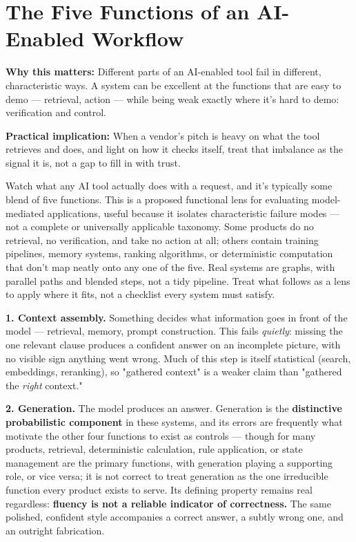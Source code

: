 \section{The Five Functions of an AI-Enabled Workflow}

\textbf{Why this matters:} Different parts of an AI-enabled tool fail in different, characteristic ways. A system can be excellent at the functions that are easy to demo --- retrieval, action --- while being weak exactly where it's hard to demo: verification and control.

\textbf{Practical implication:} When a vendor's pitch is heavy on what the tool retrieves and does, and light on how it checks itself, treat that imbalance as the signal it is, not a gap to fill in with trust.

Watch what any AI tool actually does with a request, and it's typically some blend of five functions. This is a proposed functional lens for evaluating model-mediated applications, useful because it isolates characteristic failure modes --- not a complete or universally applicable taxonomy. Some products do no retrieval, no verification, and take no action at all; others contain training pipelines, memory systems, ranking algorithms, or deterministic computation that don't map neatly onto any one of the five. Real systems are graphs, with parallel paths and blended steps, not a tidy pipeline. Treat what follows as a lens to apply where it fits, not a checklist every system must satisfy.

\textbf{1. Context assembly.} Something decides what information goes in front of the model --- retrieval, memory, prompt construction. This fails \emph{quietly}: missing the one relevant clause produces a confident answer on an incomplete picture, with no visible sign anything went wrong. Much of this step is itself statistical (search, embeddings, reranking), so "gathered context" is a weaker claim than "gathered the \emph{right} context."

\textbf{2. Generation.} The model produces an answer. Generation is the \textbf{distinctive probabilistic component} in these systems, and its errors are frequently what motivate the other four functions to exist as controls --- though for many products, retrieval, deterministic calculation, rule application, or state management are the primary functions, with generation playing a supporting role, or vice versa; it is not correct to treat generation as the one irreducible function every product exists to serve. Its defining property remains real regardless: \textbf{fluency is not a reliable indicator of correctness.} The same polished, confident style accompanies a correct answer, a subtly wrong one, and an outright fabrication.

